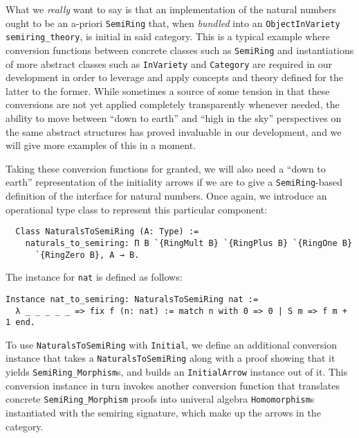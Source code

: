 \documentclass[a4paper,10pt,runningheads]{llncs}
\begin{document}
What we \emph{really} want to say is that an implementation of the natural numbers ought to be an a-priori \lstinline|SemiRing| that, when \emph{bundled} into an \lstinline|ObjectInVariety semiring_theory|, is initial in said category. This is a typical example where conversion functions between concrete classes such as \lstinline|SemiRing| and instantiations of more abstract classes such as \lstinline|InVariety| and \lstinline|Category| are required in our development in order to leverage and apply concepts and theory defined for the latter to the former. While sometimes a source of some tension in that these conversions are not yet applied completely transparently whenever needed, the ability to move between ``down to earth'' and ``high in the sky'' perspectives on the same abstract structures has proved invaluable in our development, and we will give more examples of this in a moment.

Taking these conversion functions for granted, we will also need a ``down to earth'' representation of the initiality arrows if we are to give a \lstinline|SemiRing|-based definition of the interface for natural numbers. Once again, we introduce an operational type class to represent this particular component:
\begin{lstlisting}
  Class NaturalsToSemiRing (A: Type) :=
    naturals_to_semiring: Π B `{RingMult B} `{RingPlus B} `{RingOne B}
      `{RingZero B}, A → B.
\end{lstlisting}
The instance for \lstinline|nat| is defined as follows:
\begin{lstlisting}
Instance nat_to_semiring: NaturalsToSemiRing nat :=
  λ _ _ _ _ _ => fix f (n: nat) := match n with 0 => 0 | S m => f m + 1 end.
\end{lstlisting}

To use \lstinline|NaturalsToSemiRing| with \lstinline|Initial|, we define an additional conversion instance that takes a \lstinline|NaturalsToSemiRing| along with a proof showing that it yields \mbox{\lstinline|SemiRing_Morphism|s}, and builds an \lstinline|InitialArrow| instance out of it. This conversion instance in turn invokes another conversion function that translates concrete \lstinline|SemiRing_Morphism| proofs into univeral algebra \lstinline|Homomorphism|s instantiated with the semiring signature, which make up the arrows in the category.
\end{document}
